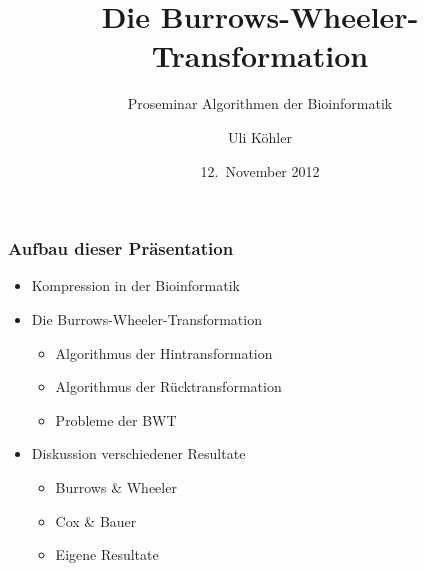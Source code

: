 \documentclass[14pt,xcolor=dvipsnames,pdftex]{beamer}
\title{Die Burrows-Wheeler-Transformation}
\subtitle{Proseminar \glqq Algorithmen der Bioinformatik\grqq}
\author{Uli Köhler}
\date{12.~November 2012}
\begin{document}
\frame{\titlepage}
\begin{frame}
\frametitle{Aufbau dieser Präsentation}
\begin{itemize}
 \item Kompression in der Bioinformatik
 \item Die Burrows-Wheeler-Transformation
 \begin{itemize}
  \item Algorithmus der Hintransformation
  \item Algorithmus der Rücktransformation
  \item Probleme der BWT
 \end{itemize}
 \item Diskussion verschiedener Resultate
 \begin{itemize}
  \item Burrows \& Wheeler
  \item Cox \& Bauer
  \item Eigene Resultate
 \end{itemize}


\end{itemize}

\end{frame}

\end{document}
